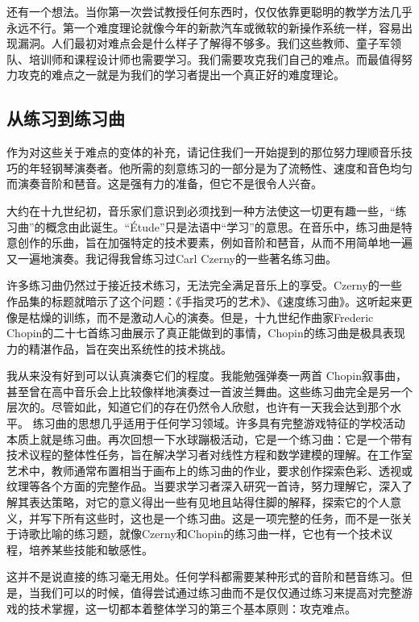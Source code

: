 还有一个想法。当你第一次尝试教授任何东西时，仅仅依靠更聪明的教学方法几乎永远不行。第一个难度理论就像今年的新款汽车或微软的新操作系统一样，容易出现漏洞。人们最初对难点会是什么样子了解得不够多。我们这些教师、童子军领队、培训师和课程设计师也需要学习。我们需要攻克我们自己的难点。而最值得努力攻克的难点之一就是为我们的学习者提出一个真正好的难度理论。

\subsection*{从练习到练习曲}

作为对这些关于难点的变体的补充，请记住我们一开始提到的那位努力理顺音乐技巧的年轻钢琴演奏者。他所需的刻意练习的一部分是为了流畅性、速度和音色均匀而演奏音阶和琶音。这是强有力的准备，但它不是很令人兴奋。

大约在十九世纪初，音乐家们意识到必须找到一种方法使这一切更有趣一些，“练习曲”的概念由此诞生。“Étude”只是法语中“学习”的意思。在音乐中，练习曲是特意创作的乐曲，旨在加强特定的技术要素，例如音阶和琶音，从而不用简单地一遍又一遍地演奏。我记得我曾练习过Carl Czerny的一些著名练习曲。

许多练习曲仍然过于接近技术练习，无法完全满足音乐上的享受。Czerny的一些作品集的标题就暗示了这个问题：《手指灵巧的艺术》、《速度练习曲》。这听起来更像是枯燥的训练，而不是激动人心的演奏。但是，十九世纪作曲家Frederic Chopin的二十七首练习曲展示了真正能做到的事情，Chopin的练习曲是极具表现力的精湛作品，旨在突出系统性的技术挑战。

我从来没有好到可以认真演奏它们的程度。我能勉强弹奏一两首 Chopin叙事曲，甚至曾在高中音乐会上比较像样地演奏过一首波兰舞曲。这些练习曲完全是另一个层次的。尽管如此，知道它们的存在仍然令人欣慰，也许有一天我会达到那个水平。
练习曲的思想几乎适用于任何学习领域。许多具有完整游戏特征的学校活动本质上就是练习曲。再次回想一下水球蹦极活动，它是一个练习曲：它是一个带有技术议程的整体性任务，旨在解决学习者对线性方程和数学建模的理解。在工作室艺术中，教师通常布置相当于画布上的练习曲的作业，要求创作探索色彩、透视或纹理等各个方面的完整作品。当要求学习者深入研究一首诗，努力理解它，深入了解其表达策略，对它的意义得出一些有见地且站得住脚的解释，探索它的个人意义，并写下所有这些时，这也是一个练习曲。这是一项完整的任务，而不是一张关于诗歌比喻的练习题，就像Czerny和Chopin的练习曲一样，它也有一个技术议程，培养某些技能和敏感性。

这并不是说直接的练习毫无用处。任何学科都需要某种形式的音阶和琶音练习。但是，当我们可以的时候，值得尝试通过练习曲而不是仅仅通过练习来提高对完整游戏的技术掌握，这一切都本着整体学习的第三个基本原则：攻克难点。

